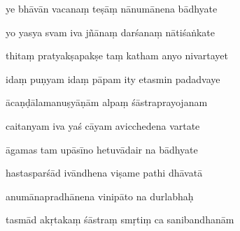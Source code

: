 \documentclass[article,12pt,a4paper]{memoir}%
\newcounter{parCount}
\begin{document}
	  
	  \pstart \leavevmode%
	ye bhāvān vacanaṃ teṣāṃ nānumānena bādhyate 
	{}
	\pend%
      

	  
	  \pstart {} yo yasya svam iva jñānaṃ darśanaṃ nātiśaṅkate 
	{}
	\pend%
      

	  
	  \pstart \leavevmode%
	thitaṃ pratyakṣapakṣe taṃ katham anyo nivartayet 
	{}
	\pend%
      

	  
	  \pstart {} idaṃ puṇyam idaṃ pāpam ity etasmin padadvaye 
	{}
	\pend%
      

	  
	  \pstart \leavevmode%
	ācaṇḍālamanuṣyāṇām alpaṃ śāstraprayojanam 
	{}
	\pend%
      

	  
	  \pstart {} caitanyam iva yaś cāyam avicchedena vartate 
	{}
	\pend%
      

	  
	  \pstart \leavevmode%
	āgamas tam upāsīno hetuvādair na bādhyate 
	{}
	\pend%
      

	  
	  \pstart {} hastasparśād ivāndhena viṣame pathi dhāvatā 
	{}
	\pend%
      

	  
	  \pstart \leavevmode%
	anumānapradhānena vinipāto na durlabhaḥ 
	{}
	\pend%
      

	  
	  \pstart {} tasmād akṛtakaṃ śāstraṃ smṛtiṃ ca sanibandhanām 
	{}
	\pend%
      
\end{document}
